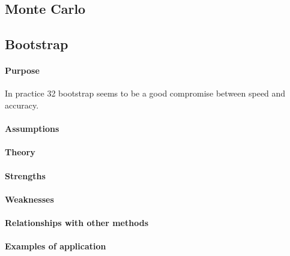 \subsection{Monte Carlo}



\subsection{Bootstrap}
\paragraph{Purpose}
In practice 32 bootstrap seems to be a good compromise between speed and accuracy.
\paragraph{Assumptions}
\paragraph{Theory}
\paragraph{Strengths}
\paragraph{Weaknesses}
\paragraph{Relationships with other methods}
\paragraph{Examples of application}

